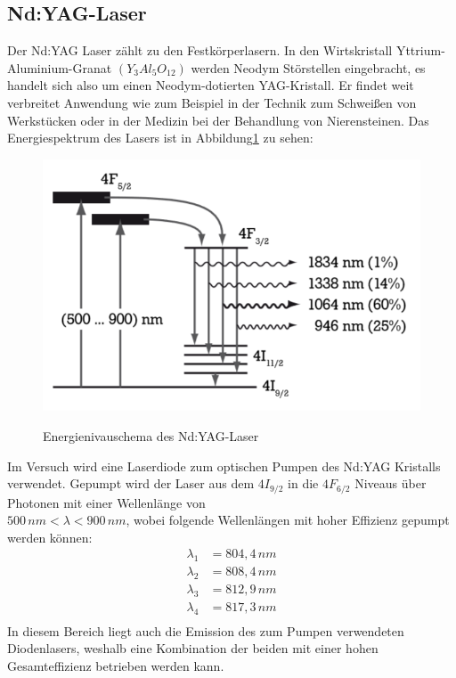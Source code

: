 \documentclass[twoside,colorback,accentcolor=tud4c,11pt]{tudreport}
\begin{document}
\subsection{Nd:YAG-Laser}
Der Nd:YAG Laser zählt zu den Festkörperlasern. In den Wirtskristall Yttrium-Aluminium-Granat $(Y_{3}Al_{5}O_{12})$ werden Neodym Störstellen eingebracht, es handelt sich also um einen Neodym-dotierten YAG-Kristall. Er findet weit verbreitet Anwendung wie zum Beispiel in der Technik zum Schweißen von Werkstücken oder in der Medizin bei der Behandlung von Nierensteinen. Das Energiespektrum des Lasers ist in Abbildung\ref{ndschem} zu sehen:
\begin{figure}[H]
\centering
   	\begin{minipage}[b]{0.6\textwidth}
   	\includegraphics[width=\textwidth]{graphics/ndyagschem.PNG}
  	\label{ndschem}
   	\end{minipage}
\caption{Energienivauschema des Nd:YAG-Laser \cite{2}} 	
\end{figure}
Im Versuch wird eine Laserdiode zum optischen Pumpen des Nd:YAG Kristalls verwendet. Gepumpt wird der Laser aus dem $4I_{9/2}$ in die $4F_{6/2}$ Niveaus über Photonen mit einer Wellenlänge von \\ $500\,\si{nm}<\lambda<900\,\si{nm}$, wobei folgende Wellenlängen mit hoher Effizienz gepumpt werden können:
\begin{align}
\lambda_{1}&=804,4\,\si{nm}\\
\lambda_{2}&=808,4\,\si{nm}\\
\lambda_{3}&=812,9\,\si{nm}\\
\lambda_{4}&=817,3\,\si{nm}\\
\end{align}
In diesem Bereich liegt auch die Emission des zum Pumpen verwendeten Diodenlasers, weshalb eine Kombination der beiden mit einer hohen Gesamteffizienz betrieben werden kann.\\
\end{document}
